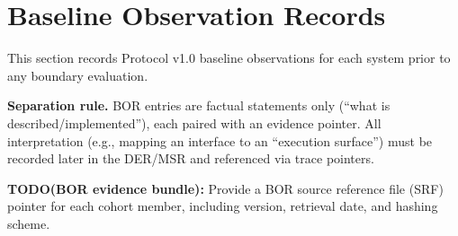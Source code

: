 \section{Baseline Observation Records}
\label{sec:bor}
This section records Protocol v1.0 baseline observations for each system prior to any boundary evaluation.

\textbf{Separation rule.} BOR entries are factual statements only (``what is described/implemented''), each paired with an evidence pointer. All interpretation (e.g., mapping an interface to an ``execution surface'') must be recorded later in the DER/MSR and referenced via trace pointers.

\textbf{TODO(BOR evidence bundle):} Provide a BOR source reference file (SRF) pointer for each cohort member, including version, retrieval date, and hashing scheme.


